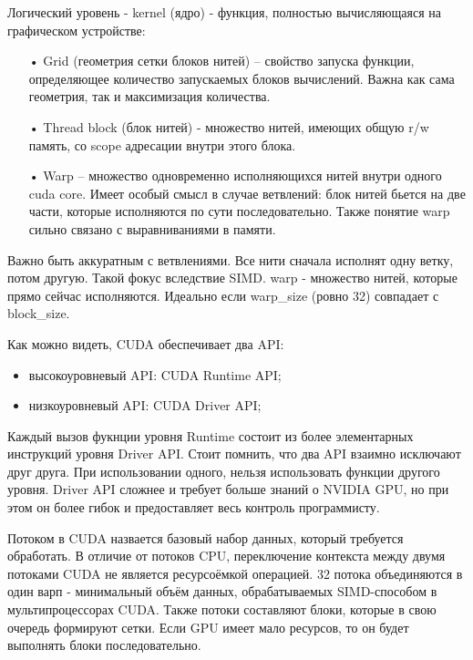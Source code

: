 \documentclass[a4paper,14pt,russian]{extreport}
\begin{document}
\par
Логический уровень - kernel (ядро) - функция, полностью вычисляющаяся на графическом устройстве:
\begin{itemize}
\item[•] Grid (геометрия сетки блоков нитей) – свойство запуска функции, определяющее количество запускаемых блоков вычислений. Важна как сама геометрия, так и максимизация количества.
\item[•] Thread block (блок нитей) - множество нитей, имеющих общую r/w память, со scope адресации внутри этого блока.
\item[•] Warp – множество одновременно исполняющихся нитей внутри одного cuda core. Имеет особый смысл в случае ветвлений: блок нитей бьется на две части, которые исполняются по сути последовательно. Также понятие warp сильно связано с выравниваниями в памяти.
\end{itemize}
\par
Важно быть аккуратным с ветвлениями. Все нити сначала исполнят одну ветку, потом другую. Такой фокус вследствие SIMD. warp - множество нитей, которые прямо сейчас исполняются. Идеально если warp\_size (ровно 32) совпадает с block\_size. 
\par 
Как можно видеть, CUDA обеспечивает два API:
\begin{itemize}
\item высокоуровневый API: CUDA Runtime API;
\item низкоуровневый API: CUDA Driver API;
\end{itemize}
\par
Каждый вызов фукнции уровня Runtime состоит из более элементарных инструкций уровня Driver API. Стоит помнить, что два API взаимно исключают друг друга. При использовании одного, нельзя использовать функции другого уровня. Driver API сложнее и требует больше знаний о NVIDIA GPU, но при этом он более гибок и предоставляет весь контроль программисту. 
\par 
Потоком в CUDA назвается базовый набор данных, который требуется обработать. В отличие от потоков CPU, переключение контекста между двумя потоками CUDA не является ресурсоёмкой операцией. 32 потока объединяются в один варп - минимальный объём данных, обрабатываемых SIMD-способом в мультипроцессорах CUDA. Также потоки составляют блоки, которые в свою очередь формируют сетки. Если GPU имеет мало ресурсов, то он будет выполнять блоки последовательно. 
\par
\end{document}

